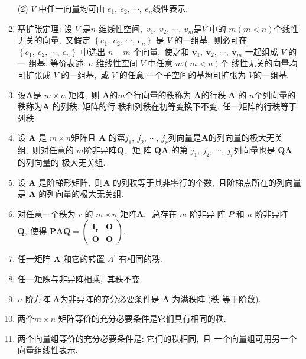 \begin{enumerate}
		(2) $ V$  中任一向量均可由 $ e_{1},\  e_{2},\  \cdots,\  e_{n}  $线性表示.
		\item 基扩张定理: 设 $ V$  是$  n $ 维线性空间,\   $v_{1},\  v_{2},\  \cdots,\  v_{m}  $是$  V $ 中的  $m(m<n)  $个线性无关的向量,\  又假定 $ \left\{e_{1},\  e_{2},\  \cdots\right. ,\   \left.e_{n}\right\}$  是 $ V $ 的一组基,\  则必可在  $\left\{e_{1},\  e_{2},\  \cdots,\  e_{n}\right\} $ 中选出 $ n-m $ 个向量,\  使之和  $\boldsymbol{v}_{1},\  \boldsymbol{v}_{2},\  \cdots,\  \boldsymbol{v}_{m} $ 一起组成  $V $ 的一 组基. 等价表述: $ n $ 维线性空间  $V$  中任意  $m(m<n)  $个 线性无关的向量均可扩张成 $ V $ 的一组基,\  或  $V $ 的任意 一个子空间的基坸可扩张为  $V  $的一组基.
		\item 设$  \boldsymbol{A}  $是 $ m \times n $ 矩阵,\  则 $ \boldsymbol{A}  $的$  m  $个行向量的秩称为 $ \boldsymbol{A}  $的行秩.$\boldsymbol{A}$  的 $ n  $个列向量的秩称为$  \boldsymbol{A} $ 的列秩. 矩阵的行 秩和列秩在初等变换下不变. 任一矩阵的行秩等于列秩.
		\item 设 $ \boldsymbol{A} $ 是  $m \times n  $矩阵且 $ \boldsymbol{A} $ 的第$  j_{1},\  j_{2},\  \cdots,\  j_{r}  $列向量是$  \boldsymbol{A}  $的列向量的极大无关组,\  则对任意的 $ m  $阶非异阵$  \boldsymbol{Q} ,\ $ 矩 阵 $ \boldsymbol{QA} $ 的第 $ j_{1},\  j_{2},\  \cdots,\  j_{r}  $列向量也是 $\boldsymbol{QA} $ 的列向量的 极大无关组.
		\item 设  $\boldsymbol{A}$  是阶梯形矩阵,\  则$  \boldsymbol{A}$  的列秩等于其非零行的个数,\  且阶梯点所在的列向量是  $\boldsymbol{A}$ 的列向量的极大无关组.
		\item 对任意一个秩为 $r $ 的 $ m \times n$  矩阵$  \boldsymbol{A} ,\ $ 总存在  $m $ 阶非异 阵 $ P$  和 $ n$  阶非异阵  $\boldsymbol{Q},\  $使得 $ \boldsymbol{PAQ}=\left(\begin{array}{ll}\boldsymbol{I_r} & \boldsymbol{O} \\ \boldsymbol{O} & \boldsymbol{O}\end{array}\right) .$
		\item 任一矩阵  $\boldsymbol{A} $ 和它的转置  $A^{\prime}$  有相同的秩.
		\item 任一矩陎与非异阵相乘,\  其秩不变.
		\item $ n $ 阶方阵 $ \boldsymbol{A}  $为非异阵的充分必要条件是  $\boldsymbol{A} $ 为满秩阵 (秩 等于阶数).
		\item 两个$  m \times n$ 矩阵等价的充分必要条件是它们具有相同的秩.
		\item 两个向量组等价的充分必要条件是: 它们的秩相同,\  且 一个向量组可用另一个向量组线性表示.

\end{enumerate}
